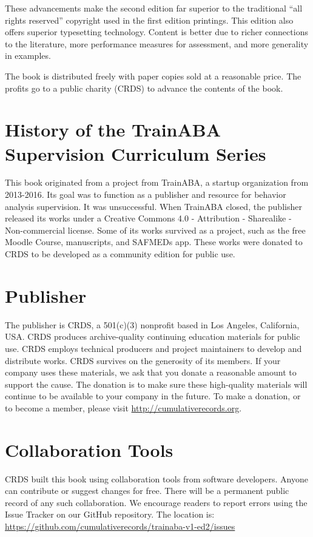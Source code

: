 These advancements make the second edition far superior to the traditional ``all rights reserved'' copyright used in the first edition printings. This edition also offers superior typesetting technology. Content is better due to richer connections to the literature, more performance measures for assessment, and more generality in examples.

The book is distributed freely with paper copies sold at a reasonable price. The profits go to a public charity (CRDS) to advance the contents of the book.

\section{History of the TrainABA Supervision Curriculum Series}
This book originated from a project from TrainABA, a startup organization from 2013-2016. Its goal was to function as a publisher and resource for behavior analysis supervision. It was unsuccessful. When TrainABA closed, the publisher released its works under a Creative Commons 4.0 - Attribution - Sharealike - Non-commercial license. Some of its works survived as a project, such as the free Moodle Course, manuscripts, and SAFMEDs app. These works were donated to CRDS to be developed as a community edition for public use. 

\section{Publisher}
The publisher is CRDS, a 501(c)(3) nonprofit based in Los Angeles, California, USA. CRDS produces archive-quality continuing education materials for public use. CRDS employs technical producers and project maintainers to develop and distribute works. CRDS survives on the generosity of its members. If your company uses these materials, we ask that you donate a reasonable amount to support the cause. The donation is to make sure these high-quality materials will continue to be available to your company in the future. To make a donation, or to become a member, please visit \url{http://cumulativerecords.org}.

\section{Collaboration Tools}
CRDS built this book using collaboration tools from software developers. Anyone can contribute or suggest changes for free. There will be a permanent public record of any such collaboration. We encourage readers to report errors using the Issue Tracker on our GitHub repository. The location is: \url{https://github.com/cumulativerecords/trainaba-v1-ed2/issues}

